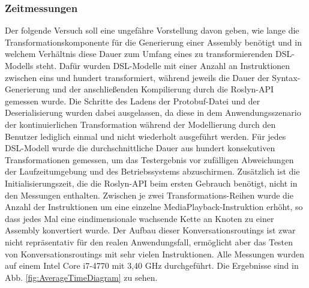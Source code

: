 \subsubsection{Zeitmessungen}
Der folgende Versuch soll eine ungefähre Vorstellung davon geben, wie lange die Transformationskomponente für die Generierung einer Assembly benötigt und in welchem Verhältnis diese Dauer zum Umfang eines zu transformierenden DSL-Modells steht. Dafür wurden DSL-Modelle mit einer Anzahl an Instruktionen zwischen eins und hundert transformiert, während jeweils die Dauer der Syntax-Generierung und der anschließenden Kompilierung durch die Roslyn-API gemessen wurde. Die Schritte des Ladens der Protobuf-Datei und der Deserialisierung wurden dabei ausgelassen, da diese in dem Anwendungsszenario der kontinuierlichen Transformation während der Modellierung durch den Benutzer lediglich einmal und nicht wiederholt ausgeführt werden. Für jedes DSL-Modell wurde die durchschnittliche Dauer aus hundert konsekutiven Transformationen gemessen, um das Testergebnis vor zufälligen Abweichungen der Laufzeitumgebung und des Betriebssystems abzuschirmen. Zusätzlich ist die Initialisierungszeit, die die Roslyn-API beim ersten Gebrauch benötigt, nicht in den Messungen enthalten. Zwischen je zwei Transformations-Reihen wurde die Anzahl der Instruktionen um eine einzelne MediaPlayback-Instruktion erhöht, so dass jedes Mal eine eindimensionale wachsende Kette an Knoten zu einer Assembly konvertiert wurde. Der Aufbau dieser Konversationsroutings ist zwar nicht repräsentativ für den realen Anwendungsfall, ermöglicht aber das Testen von Konversationsroutings mit sehr vielen Instruktionen. Alle Messungen wurden auf einem Intel Core i7-4770 mit 3,40 GHz durchgeführt. Die Ergebnisse sind in Abb. \ref{fig:AverageTimeDiagram} zu sehen.


